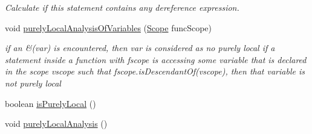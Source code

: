 \begin{DoxyCompactItemize}
\begin{DoxyCompactList}\small\item\em Calculate if this statement contains any dereference expression. \end{DoxyCompactList}\item 
void \hyperlink{interfaceedu_1_1udel_1_1cis_1_1vsl_1_1civl_1_1model_1_1IF_1_1statement_1_1Statement_a957515831f12970b737db375e93168c6}{purely\+Local\+Analysis\+Of\+Variables} (\hyperlink{interfaceedu_1_1udel_1_1cis_1_1vsl_1_1civl_1_1model_1_1IF_1_1Scope}{Scope} func\+Scope)
\begin{DoxyCompactList}\small\item\em if an \&(var) is encountered, then var is considered as no purely local if a statement inside a function with fscope is accessing some variable that is declared in the scope vscope such that fscope.\+is\+Descendant\+Of(vscope), then that variable is not purely local \end{DoxyCompactList}\item 
boolean \hyperlink{interfaceedu_1_1udel_1_1cis_1_1vsl_1_1civl_1_1model_1_1IF_1_1statement_1_1Statement_a774094d9a24385d4858513932745b67c}{is\+Purely\+Local} ()
\item 
\hypertarget{interfaceedu_1_1udel_1_1cis_1_1vsl_1_1civl_1_1model_1_1IF_1_1statement_1_1Statement_a8393b2b32538e6535bea748863245795}{}void \hyperlink{interfaceedu_1_1udel_1_1cis_1_1vsl_1_1civl_1_1model_1_1IF_1_1statement_1_1Statement_a8393b2b32538e6535bea748863245795}{purely\+Local\+Analysis} ()\label{interfaceedu_1_1udel_1_1cis_1_1vsl_1_1civl_1_1model_1_1IF_1_1statement_1_1Statement_a8393b2b32538e6535bea748863245795}


\end{DoxyCompactItemize}
